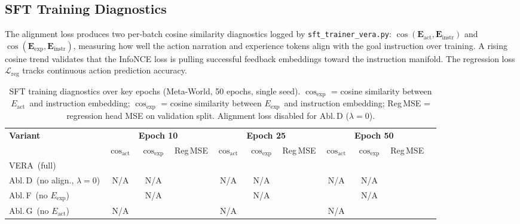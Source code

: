\documentclass{article}
\newcommand{\modelname}{\textsc{VERA}\xspace}
\newcommand{\Lact}{$E_{\mathrm{act}}$\xspace}   %
\newcommand{\Lexp}{$E_{\mathrm{exp}}$\xspace}   %
\begin{document}
\subsection{SFT Training Diagnostics}
\label{sec:diagnostics}

The alignment loss produces two per-batch cosine similarity diagnostics logged by
\texttt{sft\_trainer\_vera.py}: $\cos(\mathbf{E}_\mathrm{act}, \mathbf{E}_\mathrm{instr})$
and $\cos(\mathbf{E}_\mathrm{exp}, \mathbf{E}_\mathrm{instr})$, measuring how well the
action narration and experience tokens align with the goal instruction over training.
A rising cosine trend validates that the InfoNCE loss is pulling successful feedback
embeddings toward the instruction manifold.
The regression loss $\mathcal{L}_\mathrm{reg}$ tracks continuous action prediction accuracy.

\begin{table}[h]
\centering
\caption{SFT training diagnostics over key epochs (Meta-World, 50 epochs, single seed).
         $\cos_\mathrm{exp}$ = cosine similarity between \Lact\ and instruction embedding;
         $\cos_\mathrm{exp}$ = cosine similarity between \Lexp\ and instruction embedding;
         Reg\,MSE = regression head MSE on validation split.
         Alignment loss disabled for Abl.\,D ($\lambda{=}0$).}
\label{tab:sft_diagnostics}
\small
\setlength{\tabcolsep}{5pt}
\begin{tabular}{lcccccccccc}
\toprule
\multirow{2}{*}{\textbf{Variant}}
  & \multicolumn{3}{c}{\textbf{Epoch 10}}
  & \multicolumn{3}{c}{\textbf{Epoch 25}}
  & \multicolumn{3}{c}{\textbf{Epoch 50}} \\
  \cmidrule(lr){2-4}\cmidrule(lr){5-7}\cmidrule(lr){8-10}
  & $\cos_\mathrm{act}$ & $\cos_\mathrm{exp}$ & Reg\,MSE
  & $\cos_\mathrm{act}$ & $\cos_\mathrm{exp}$ & Reg\,MSE
  & $\cos_\mathrm{act}$ & $\cos_\mathrm{exp}$ & Reg\,MSE \\
\midrule
\modelname\ (full)
  & \text{---} & \text{---} & \text{---}
  & \text{---} & \text{---} & \text{---}
  & \text{---} & \text{---} & \text{---} \\
Abl.\,D\ (no align., $\lambda{=}0$)
  & N/A & N/A & \text{---}
  & N/A & N/A & \text{---}
  & N/A & N/A & \text{---} \\
Abl.\,F\ (no \Lexp)
  & \text{---} & N/A & \text{---}
  & \text{---} & N/A & \text{---}
  & \text{---} & N/A & \text{---} \\
Abl.\,G\ (no \Lact)
  & N/A & \text{---} & \text{---}
  & N/A & \text{---} & \text{---}
  & N/A & \text{---} & \text{---} \\
\bottomrule
\end{tabular}
\vspace{2pt}\\
\footnotesize
\end{table}
\end{document}
